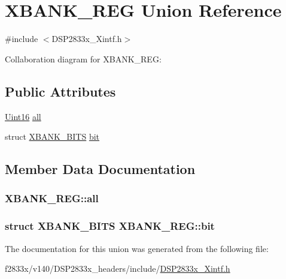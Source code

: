 \hypertarget{union_x_b_a_n_k___r_e_g}{}\section{X\+B\+A\+N\+K\+\_\+\+R\+E\+G Union Reference}
\label{union_x_b_a_n_k___r_e_g}


{\ttfamily \#include $<$D\+S\+P2833x\+\_\+\+Xintf.\+h$>$}



Collaboration diagram for X\+B\+A\+N\+K\+\_\+\+R\+E\+G\+:
\subsection*{Public Attributes}
\begin{DoxyCompactItemize}
\item 
\hyperlink{_d_s_p2833x___device_8h_a59a9f6be4562c327cbfb4f7e8e18f08b}{Uint16} \hyperlink{union_x_b_a_n_k___r_e_g_a87d80c83de17e6d336b75415a1bf95b6}{all}
\item 
struct \hyperlink{struct_x_b_a_n_k___b_i_t_s}{X\+B\+A\+N\+K\+\_\+\+B\+I\+T\+S} \hyperlink{union_x_b_a_n_k___r_e_g_a0ed39b6c7031cc1744063cae850a6865}{bit}
\end{DoxyCompactItemize}


\subsection{Member Data Documentation}
\hypertarget{union_x_b_a_n_k___r_e_g_a87d80c83de17e6d336b75415a1bf95b6}{}
\subsubsection[{all}]{ X\+B\+A\+N\+K\+\_\+\+R\+E\+G\+::all}\label{union_x_b_a_n_k___r_e_g_a87d80c83de17e6d336b75415a1bf95b6}
\hypertarget{union_x_b_a_n_k___r_e_g_a0ed39b6c7031cc1744063cae850a6865}{}
\subsubsection[{bit}]{\setlength{\rightskip}{0pt plus 5cm}struct {\bf X\+B\+A\+N\+K\+\_\+\+B\+I\+T\+S} X\+B\+A\+N\+K\+\_\+\+R\+E\+G\+::bit}\label{union_x_b_a_n_k___r_e_g_a0ed39b6c7031cc1744063cae850a6865}


The documentation for this union was generated from the following file\+:\begin{DoxyCompactItemize}
\item 
f2833x/v140/\+D\+S\+P2833x\+\_\+headers/include/\hyperlink{_d_s_p2833x___xintf_8h}{D\+S\+P2833x\+\_\+\+Xintf.\+h}\end{DoxyCompactItemize}
